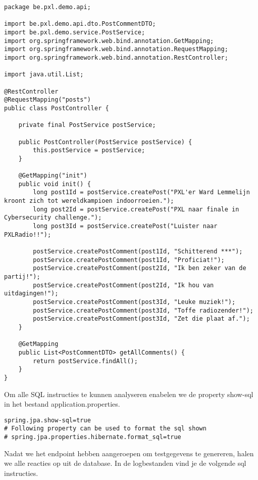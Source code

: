 \begin{lstlisting}
package be.pxl.demo.api;

import be.pxl.demo.api.dto.PostCommentDTO;
import be.pxl.demo.service.PostService;
import org.springframework.web.bind.annotation.GetMapping;
import org.springframework.web.bind.annotation.RequestMapping;
import org.springframework.web.bind.annotation.RestController;

import java.util.List;

@RestController
@RequestMapping("posts")
public class PostController {

    private final PostService postService;

    public PostController(PostService postService) {
        this.postService = postService;
    }

    @GetMapping("init")
    public void init() {
        long post1Id = postService.createPost("PXL'er Ward Lemmelijn kroont zich tot wereldkampioen indoorroeien.");
        long post2Id = postService.createPost("PXL naar finale in Cybersecurity challenge.");
        long post3Id = postService.createPost("Luister naar PXLRadio!!");

        postService.createPostComment(post1Id, "Schitterend ***");
        postService.createPostComment(post1Id, "Proficiat!");
        postService.createPostComment(post2Id, "Ik ben zeker van de partij!");
        postService.createPostComment(post2Id, "Ik hou van uitdagingen!");
        postService.createPostComment(post3Id, "Leuke muziek!");
        postService.createPostComment(post3Id, "Toffe radiozender!");
        postService.createPostComment(post3Id, "Zet die plaat af.");
    }

    @GetMapping
    public List<PostCommentDTO> getAllComments() {
        return postService.findAll();
    }
}
\end{lstlisting}

Om alle SQL instructies te kunnen analyseren enabelen we de property show-sql in het bestand application.properties.

\begin{lstlisting}
spring.jpa.show-sql=true
# Following property can be used to format the sql shown
# spring.jpa.properties.hibernate.format_sql=true 
\end{lstlisting}

Nadat we het endpoint hebben aangeroepen om testgegevens te genereren,  halen we alle reacties op uit de database.
In de logbestanden vind je de volgende sql instructies.

